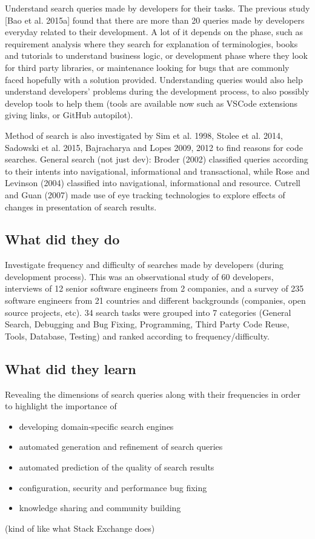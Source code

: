 Understand search queries made by developers for their tasks. The previous study [Bao et al. 2015a] found that there are more than 20 queries made by developers everyday related to their development. A lot of it depends on the phase, such as requirement analysis where they search for explanation of terminologies, books and tutorials to understand business logic, or development phase where they look for third party libraries, or maintenance looking for bugs that are commonly faced hopefully with a solution provided. Understanding queries would also help understand developers' problems during the development process, to also possibly develop tools to help them (tools are available now such as VSCode extensions giving links, or GitHub autopilot).

Method of search is also investigated by Sim et al. 1998, Stolee et al. 2014, Sadowski et al. 2015, Bajracharya and Lopes 2009, 2012 to find reasons for code searches. General search (not just dev): Broder (2002) classified queries according to their intents into navigational, informational and transactional, while Rose and Levinson (2004) classified into navigational, informational and resource. Cutrell and Guan (2007) made use of eye tracking technologies to explore effects of changes in presentation of search results.

\subsection{What did they do}

Investigate frequency and difficulty of searches made by developers (during development process). This was an observational study of 60 developers, interviews of 12 senior software engineers from 2 companies, and a survey of 235 software engineers from 21 countries and different backgrounds (companies, open source projects, etc). 34 search tasks were grouped into 7 categories (General Search, Debugging and Bug Fixing, Programming, Third Party Code Reuse, Tools, Database, Testing) and ranked according to frequency/difficulty.

\subsection{What did they learn}

Revealing the dimensions of search queries along with their frequencies in order to highlight the importance of

\begin{itemize}
    \item developing domain-specific search engines
    \item automated generation and refinement of search queries
    \item automated prediction of the quality of search results
    \item configuration, security and performance bug fixing
    \item knowledge sharing and community building
\end{itemize}

(kind of like what Stack Exchange does)
